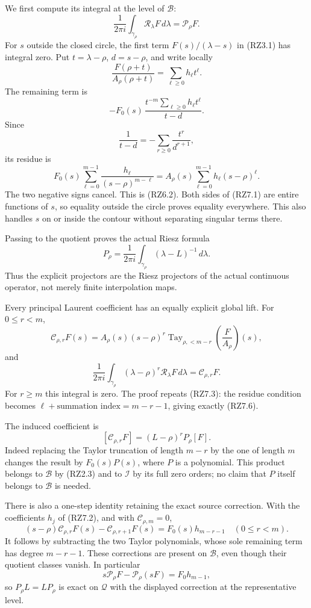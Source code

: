 \documentclass[
]{article}
\begin{document}
We first compute its integral at the level of \(\mathcal B\): \[
\frac1{2\pi i}\int_{\gamma_\rho}
\mathscr R_\lambda F\,d\lambda=\mathscr P_\rho F.
\tag{RZ7.1}
\] For \(s\) outside the closed circle, the first term
\(F(s)/(\lambda-s)\) in (RZ3.1) has integral zero. Put
\(t=\lambda-\rho\), \(d=s-\rho\), and write locally \[
\frac{F(\rho+t)}{A_\rho(\rho+t)}
=\sum_{\ell\geq0}h_\ell t^\ell.
\tag{RZ7.2}
\] The remaining term is \[
-F_0(s)\,
\frac{t^{-m}\sum_{\ell\geq0}h_\ell t^\ell}{t-d}.
\] Since \[
\frac1{t-d}=-\sum_{r\geq0}\frac{t^r}{d^{r+1}},
\tag{RZ7.3}
\] its residue is \[
F_0(s)\sum_{\ell=0}^{m-1}
\frac{h_\ell}{(s-\rho)^{m-\ell}}
=A_\rho(s)\sum_{\ell=0}^{m-1}h_\ell(s-\rho)^\ell.
\tag{RZ7.4}
\] The two negative signs cancel. This is (RZ6.2). Both sides of (RZ7.1)
are entire functions of \(s\), so equality outside the circle proves
equality everywhere. This also handles \(s\) on or inside the contour
without separating singular terms there.

Passing to the quotient proves the actual Riesz formula \[
\boxed{\quad
P_\rho=\frac1{2\pi i}\int_{\gamma_\rho}
(\lambda-L)^{-1}\,d\lambda.
\quad}
\tag{RZ7.5}
\] Thus the explicit projectors are the Riesz projectors of the actual
continuous operator, not merely finite interpolation maps.

Every principal Laurent coefficient has an equally explicit global lift.
For \(0\leq r<m\), \[
\mathscr C_{\rho,r}F(s)
=A_\rho(s)(s-\rho)^r
\operatorname{Tay}_{\rho,<m-r}
\left(\frac{F}{A_\rho}\right)(s),
\tag{RZ7.6}
\] and \[
\frac1{2\pi i}\int_{\gamma_\rho}
(\lambda-\rho)^r\mathscr R_\lambda F\,d\lambda
=\mathscr C_{\rho,r}F.
\tag{RZ7.7}
\] For \(r\geq m\) this integral is zero. The proof repeats (RZ7.3): the
residue condition becomes \(\ell+\text{summation index}=m-r-1\), giving
exactly (RZ7.6).

The induced coefficient is \[
[\mathscr C_{\rho,r}F]
=(L-\rho)^rP_\rho[F].
\tag{RZ7.8}
\] Indeed replacing the Taylor truncation of length \(m-r\) by the one
of length \(m\) changes the result by \(F_0(s)P(s)\), where \(P\) is a
polynomial. This product belongs to \(\mathcal B\) by (RZ2.3) and to
\(\mathcal I\) by its full zero orders; no claim that \(P\) itself
belongs to \(\mathcal B\) is needed.

There is also a one-step identity retaining the exact source correction.
With the coefficients \(h_j\) of (RZ7.2), and with
\(\mathscr C_{\rho,m}=0\), \[
(s-\rho)\mathscr C_{\rho,r}F(s)
-\mathscr C_{\rho,r+1}F(s)
=F_0(s)h_{m-r-1}
\quad(0\leq r<m).
\tag{RZ7.11}
\] It follows by subtracting the two Taylor polynomials, whose sole
remaining term has degree \(m-r-1\). These corrections are present on
\(\mathcal B\), even though their quotient classes vanish. In particular
\[
s\mathscr P_\rho F-\mathscr P_\rho(sF)
=F_0h_{m-1},
\tag{RZ7.12}
\] so \(P_\rho L=LP_\rho\) is exact on \(\mathcal Q\) with the displayed
correction at the representative level.
\end{document}
